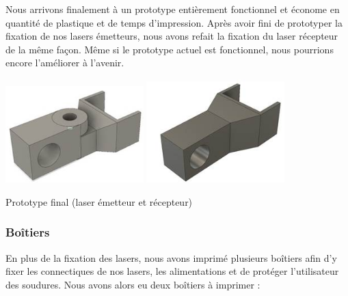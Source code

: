 Nous arrivons finalement à un prototype entièrement fonctionnel et économe en quantité de plastique et de temps d’impression. Après avoir fini de prototyper la fixation de nos lasers émetteurs, nous avons refait la fixation du laser récepteur de la même façon. Même si le prototype actuel est fonctionnel, nous pourrions encore l'améliorer à l'avenir. 
\begin{center}
    \includegraphics[width=0.4\textwidth]{photoHugo/image019}
    \includegraphics[width=0.4\textwidth]{photoHugo/image021}
    
    Prototype final (laser émetteur et récepteur)
\end{center}

\subsubsection{Boîtiers}
En plus de la fixation des lasers, nous avons imprimé plusieurs boîtiers afin d’y fixer les connectiques de nos lasers, les alimentations et de protéger l’utilisateur des soudures. Nous avons alors eu deux boîtiers à imprimer :
